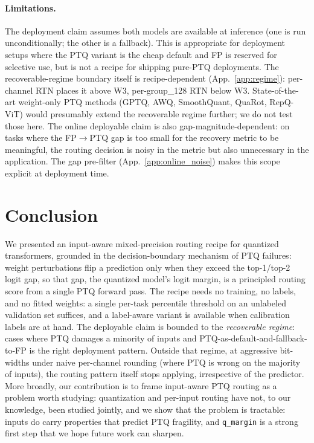 \documentclass{article}
\newcommand{\fp}{\textsc{FP}\xspace}
\newcommand{\ptq}{\textsc{PTQ}\xspace}
\begin{document}
\paragraph{Limitations.}
The deployment claim assumes both models are available at inference (one is run unconditionally; the other is a fallback).
This is appropriate for deployment setups where the \ptq{} variant is the cheap default and \fp{} is reserved for selective use, but is not a recipe for shipping pure-\ptq{} deployments.
The recoverable-regime boundary itself is recipe-dependent (App.~\ref{app:regime}): per-channel RTN places it above W3, per-group\_128 RTN below W3. State-of-the-art weight-only PTQ methods (GPTQ, AWQ, SmoothQuant, QuaRot, RepQ-ViT) would presumably extend the recoverable regime further; we do not test those here.
The online deployable claim is also gap-magnitude-dependent: on tasks where the FP$\to$PTQ gap is too small for the recovery metric to be meaningful, the routing decision is noisy in the metric but also unnecessary in the application. The gap pre-filter (App.~\ref{app:online_noise}) makes this scope explicit at deployment time.

\section{Conclusion}

We presented an input-aware mixed-precision routing recipe for quantized transformers, grounded in the decision-boundary mechanism of PTQ failures: weight perturbations flip a prediction only when they exceed the top-1/top-2 logit gap, so that gap, the quantized model's logit margin, is a principled routing score from a single \ptq{} forward pass. The recipe needs no training, no labels, and no fitted weights: a single per-task percentile threshold on an unlabeled validation set suffices, and a label-aware variant is available when calibration labels are at hand. The deployable claim is bounded to the \emph{recoverable regime}: cases where PTQ damages a minority of inputs and PTQ-as-default-and-fallback-to-FP is the right deployment pattern. Outside that regime, at aggressive bit-widths under naive per-channel rounding (where PTQ is wrong on the majority of inputs), the routing pattern itself stops applying, irrespective of the predictor. More broadly, our contribution is to frame input-aware PTQ routing as a problem worth studying: quantization and per-input routing have not, to our knowledge, been studied jointly, and we show that the problem is tractable: inputs do carry properties that predict PTQ fragility, and \texttt{q\_margin} is a strong first step that we hope future work can sharpen.
\end{document}
